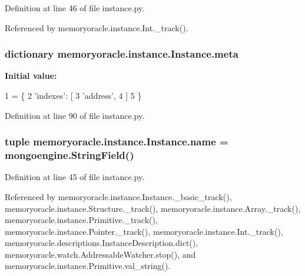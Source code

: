 Definition at line 46 of file instance.\+py.



Referenced by memoryoracle.\+instance.\+Int.\+\_\+track().

\hypertarget{classmemoryoracle_1_1instance_1_1Instance_a31fd202a9f8416abcad47ab2902370f8}{}
\subsubsection[{meta}]{\setlength{\rightskip}{0pt plus 5cm}dictionary memoryoracle.\+instance.\+Instance.\+meta\hspace{0.3cm}{\ttfamily [static]}}\label{classmemoryoracle_1_1instance_1_1Instance_a31fd202a9f8416abcad47ab2902370f8}
{\bfseries Initial value\+:}
\begin{DoxyCode}
1 = \{
2         \textcolor{stringliteral}{'indexes'}: [
3             \textcolor{stringliteral}{'address'},
4         ]
5     \}
\end{DoxyCode}


Definition at line 90 of file instance.\+py.

\hypertarget{classmemoryoracle_1_1instance_1_1Instance_a2534bb2f3733b10de23efa5e81c36c94}{}
\subsubsection[{name}]{\setlength{\rightskip}{0pt plus 5cm}tuple memoryoracle.\+instance.\+Instance.\+name = mongoengine.\+String\+Field()\hspace{0.3cm}{\ttfamily [static]}}\label{classmemoryoracle_1_1instance_1_1Instance_a2534bb2f3733b10de23efa5e81c36c94}


Definition at line 45 of file instance.\+py.



Referenced by memoryoracle.\+instance.\+Instance.\+\_\+basic\+\_\+track(), memoryoracle.\+instance.\+Structure.\+\_\+track(), memoryoracle.\+instance.\+Array.\+\_\+track(), memoryoracle.\+instance.\+Primitive.\+\_\+track(), memoryoracle.\+instance.\+Pointer.\+\_\+track(), memoryoracle.\+instance.\+Int.\+\_\+track(), memoryoracle.\+descriptions.\+Instance\+Description.\+dict(), memoryoracle.\+watch.\+Addressable\+Watcher.\+stop(), and memoryoracle.\+instance.\+Primitive.\+val\+\_\+string().

